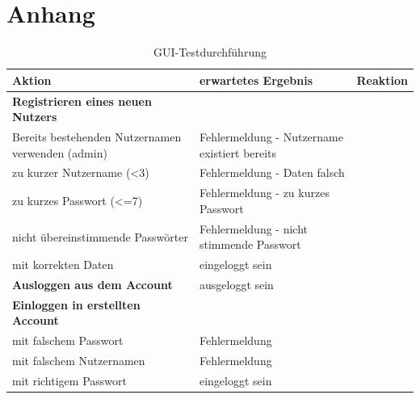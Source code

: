 \section*{Anhang}

\anhangsverzeichnis


\begin{center}
    \label{fig:testdurchf}
    \begin{longtable}{|p{}|p{}|p{}|}
        \caption{GUI-Testdurchführung}\\
        \hline
        Aktion & erwartetes Ergebnis & Reaktion\\
        \hline
        \hline

        \textbf{Registrieren eines neuen Nutzers} & &\\
        \hline
        Bereits bestehenden Nutzernamen verwenden (admin) & Fehlermeldung - Nutzername existiert bereits &\\
        \hline
        zu kurzer Nutzername (<3) & Fehlermeldung - Daten falsch &\\
        \hline
        zu kurzes Passwort (<=7) & Fehlermeldung - zu kurzes Passwort &\\
        \hline
        nicht übereinstimmende Passwörter & Fehlermeldung - nicht stimmende Passwort &\\
        \hline
        mit korrekten Daten & eingeloggt sein &\\
        \hline
        \hline

        \textbf{Ausloggen aus dem Account} & ausgeloggt sein &\\
        \hline
        \hline

        \textbf{Einloggen in erstellten Account} & &\\
        \hline
        mit falschem Passwort & Fehlermeldung &\\
        \hline
        mit falschem Nutzernamen & Fehlermeldung &\\
        \hline
        mit richtigem Passwort & eingeloggt sein &\\
        \hline
        \hline


\end{longtable}
\end{center}
